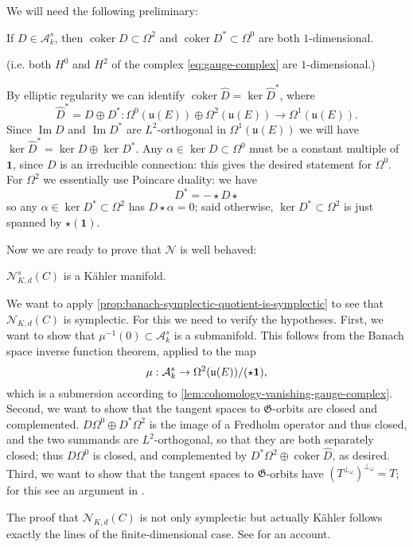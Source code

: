 \documentclass[12pt,letterpaper,reqno]{article}
\numberwithin{equation}{section}
\newcommand{\fu}{{\mathfrak u}}
\newcommand{\fG}{{\mathfrak G}}
\newcommand{\cN}{\ensuremath{\mathcal N}}
\newcommand{\cA}{\ensuremath{\mathcal A}}
\newcommand{\kahler}{K\"ahler\xspace}
\newcommand\bid{{\mathbf 1}}
\DeclareMathOperator{\im}{Im}
\DeclareMathOperator{\coker}{coker}
\begin{document}
We will need the following preliminary:
\begin{lem} 
\label{lem:cohomology-vanishing-gauge-complex}
If $D \in \cA^s_k$, then
$\coker D \subset \Omega^2$ and $\coker D^* \subset \Omega^0$ are both $1$-dimensional.
\end{lem}
(i.e. both $H^0$ and $H^2$ of the complex \eqref{eq:gauge-complex} are
$1$-dimensional.)
\begin{pf}
By elliptic regularity we can identify
$\coker \hat{D} = \ker \hat{D}^*$, where
\begin{equation}
  \hat{D}^* = D \oplus D^*: \Omega^0(\fu(E)) \oplus \Omega^2(\fu(E)) \to \Omega^1(\fu(E)).
\end{equation}
Since $\im D$ and $\im D^*$ are $L^2$-orthogonal in $\Omega^1(\fu(E))$
we will have $\ker \hat{D}^* = \ker D \oplus \ker D^*$.
Any $\alpha \in \ker D \subset \Omega^0$ must be a constant multiple
of $\bid$, since $D$ is an irreducible connection: this gives
the desired statement for $\Omega^0$. For $\Omega^2$ we essentially
use Poincare duality: we have
\begin{equation}
  D^* = - \star D \star
\end{equation}
so any $\alpha \in \ker D^* \subset \Omega^2$ has $D \star \alpha = 0$; said
otherwise, $\ker D^* \subset \Omega^2$ is just spanned by $\star (\bid)$.
\end{pf}

Now we are ready to prove that $\cN$ is well behaved:
\begin{thm}[$\cN^s_{K,d}(C)$ is \kahler] \label{thm:N-is-kahler}
$\cN^s_{K,d}(C)$ is a \kahler manifold.
\end{thm}
\begin{pf}
We want to apply 
\autoref{prop:banach-symplectic-quotient-is-symplectic}
to see that $\cN_{K,d}(C)$ is symplectic.
For this we need to verify the hypotheses.
First, we want 
to show that $\mu^{-1}(0) \subset \cA^s_{k}$ is a submanifold. 
This follows from the
Banach space inverse function theorem, applied to the map
\begin{equation}
\mu: \cA^s_k \to \Omega^2(\fu(E)) / (\star \bf 1),
\end{equation}
which is a submersion according to 
\autoref{lem:cohomology-vanishing-gauge-complex}.
Second, we want to show that the tangent spaces to $\fG$-orbits are
closed and complemented.
$D \Omega^0 \oplus D^* \Omega^2$ is the image of 
a Fredholm operator and thus closed, and the two summands
are $L^2$-orthogonal, so that they are both separately closed;
thus $D \Omega^0$ is closed, and complemented by
$D^* \Omega^2 \oplus \coker \hat{D}$, as desired.
Third, we want to show that the tangent spaces to $\fG$-orbits
have $(T^{\perp_\omega})^{\perp_\omega} = T$; for this
see an argument in \cite{MR909698}.

The proof that $\cN_{K,d}(C)$
is not only symplectic but actually 
\kahler follows exactly the lines of the finite-dimensional
case. See \cite{Tumpach2007} for an account.
\end{pf}
\end{document}
